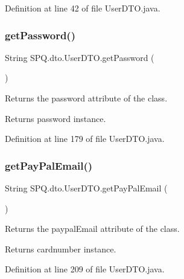 Definition at line 42 of file User\+D\+T\+O.\+java.

\mbox{\label{class_s_p_q_1_1dto_1_1_user_d_t_o_a955f436e60336683283a6fcd6fc5f874}} 
\subsubsection{\texorpdfstring{get\+Password()}{getPassword()}\hspace{0.1cm}{\footnotesize\ttfamily [3/3]}}
{\footnotesize\ttfamily String S\+P\+Q.\+dto.\+User\+D\+T\+O.\+get\+Password (\begin{DoxyParamCaption}{ }\end{DoxyParamCaption})}

Returns the password attribute of the class. \begin{DoxyReturn}{Returns}
password instance. 
\end{DoxyReturn}


Definition at line 179 of file User\+D\+T\+O.\+java.

\mbox{\label{class_s_p_q_1_1dto_1_1_user_d_t_o_a42f2eecae334e6e937419b1c201cb1f2}} 
\subsubsection{\texorpdfstring{get\+Pay\+Pal\+Email()}{getPayPalEmail()}}
{\footnotesize\ttfamily String S\+P\+Q.\+dto.\+User\+D\+T\+O.\+get\+Pay\+Pal\+Email (\begin{DoxyParamCaption}{ }\end{DoxyParamCaption})}

Returns the paypal\+Email attribute of the class. \begin{DoxyReturn}{Returns}
cardnumber instance. 
\end{DoxyReturn}


Definition at line 209 of file User\+D\+T\+O.\+java.

